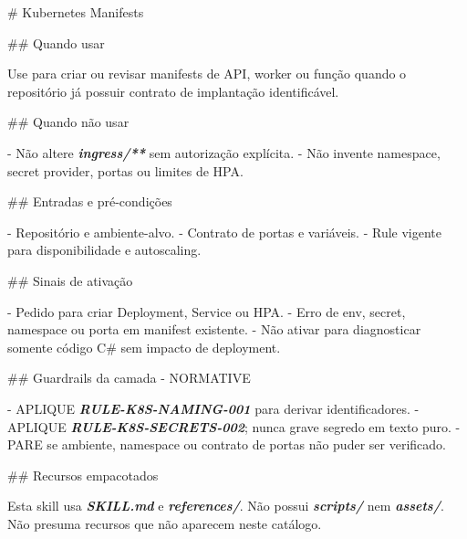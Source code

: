 \documentclass[
  10pt,
  a4paper,
  oneside]{book}
\newenvironment{Shaded}{}{}
\newcommand{\FunctionTok}[1]{\textcolor[rgb]{0.02,0.16,0.49}{#1}}
\newcommand{\InformationTok}[1]{\textcolor[rgb]{0.38,0.63,0.69}{\textbf{\textit{#1}}}}
\newcommand{\NormalTok}[1]{#1}
\newcommand{\SpecialStringTok}[1]{\textcolor[rgb]{0.73,0.40,0.53}{#1}}
\begin{document}
\begin{Shaded}
\begin{Highlighting}[]
\FunctionTok{\# Kubernetes Manifests}

\FunctionTok{\#\# Quando usar}

\NormalTok{Use para criar ou revisar manifests de API, worker ou função quando o}
\NormalTok{repositório já possuir contrato de implantação identificável.}

\FunctionTok{\#\# Quando não usar}

\SpecialStringTok{{-} }\NormalTok{Não altere }\InformationTok{\textasciigrave{}ingress/**\textasciigrave{}}\NormalTok{ sem autorização explícita.}
\SpecialStringTok{{-} }\NormalTok{Não invente namespace, secret provider, portas ou limites de HPA.}

\FunctionTok{\#\# Entradas e pré{-}condições}

\SpecialStringTok{{-} }\NormalTok{Repositório e ambiente{-}alvo.}
\SpecialStringTok{{-} }\NormalTok{Contrato de portas e variáveis.}
\SpecialStringTok{{-} }\NormalTok{Rule vigente para disponibilidade e autoscaling.}

\FunctionTok{\#\# Sinais de ativação}

\SpecialStringTok{{-} }\NormalTok{Pedido para criar Deployment, Service ou HPA.}
\SpecialStringTok{{-} }\NormalTok{Erro de env, secret, namespace ou porta em manifest existente.}
\SpecialStringTok{{-} }\NormalTok{Não ativar para diagnosticar somente código C\# sem impacto de deployment.}

\FunctionTok{\#\# Guardrails da camada {-} NORMATIVE}

\SpecialStringTok{{-} }\NormalTok{APLIQUE }\InformationTok{\textasciigrave{}RULE{-}K8S{-}NAMING{-}001\textasciigrave{}}\NormalTok{ para derivar identificadores.}
\SpecialStringTok{{-} }\NormalTok{APLIQUE }\InformationTok{\textasciigrave{}RULE{-}K8S{-}SECRETS{-}002\textasciigrave{}}\NormalTok{; nunca grave segredo em texto puro.}
\SpecialStringTok{{-} }\NormalTok{PARE se ambiente, namespace ou contrato de portas não puder ser verificado.}

\FunctionTok{\#\# Recursos empacotados}

\NormalTok{Esta skill usa }\InformationTok{\textasciigrave{}SKILL.md\textasciigrave{}}\NormalTok{ e }\InformationTok{\textasciigrave{}references/\textasciigrave{}}\NormalTok{. Não possui }\InformationTok{\textasciigrave{}scripts/\textasciigrave{}}\NormalTok{ nem }\InformationTok{\textasciigrave{}assets/\textasciigrave{}}\NormalTok{.}
\NormalTok{Não presuma recursos que não aparecem neste catálogo.}


\end{Highlighting}
\end{Shaded}
\end{document}
